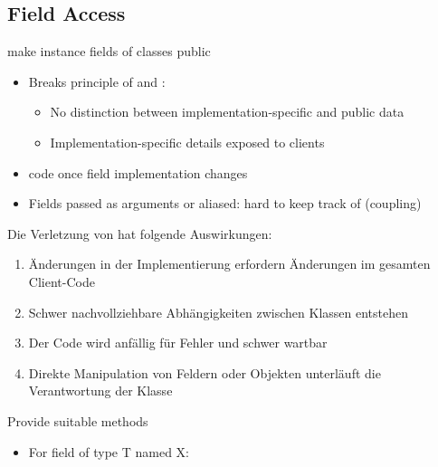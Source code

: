 \subsection{Field Access}
\begin{defBox}
     make instance fields of classes  public
\end{defBox}
\begin{itemize}
    \item Breaks principle of  and :
    \begin{itemize}
        \item No distinction between implementation-specific and public data
        \item Implementation-specific details exposed to clients
    \end{itemize}
    \item {} code once field implementation changes
    \item Fields passed as arguments or aliased: hard to keep track of  (coupling)
\end{itemize}
\begin{infoBox}
    Die Verletzung von  hat folgende Auswirkungen:
    \begin{enumerate}
        \item {} Änderungen in der Implementierung erfordern Änderungen im gesamten Client-Code
        \item {} Schwer nachvollziehbare Abhängigkeiten zwischen Klassen entstehen
        \item {} Der Code wird anfällig für Fehler und schwer wartbar
        \item {} Direkte Manipulation von Feldern oder Objekten unterläuft die Verantwortung der Klasse
    \end{enumerate}
\end{infoBox}
\begin{defBox}[title=How to Access Fields of Other Objects?]
    Provide suitable  methods
    \begin{itemize}
        \item For field of type T named X: 
    \end{itemize}
\end{defBox}
